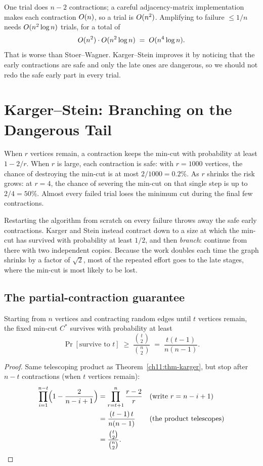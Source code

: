 \begin{complexitybox}
One trial does $n-2$ contractions; a careful adjacency-matrix implementation makes each contraction $O(n)$, so a trial is $O(n^2)$. Amplifying to failure $\le 1/n$ needs $O(n^2\log n)$ trials, for a total of
\[
  O(n^2)\cdot O(n^2\log n) \;=\; O(n^4\log n).
\]
That is worse than Stoer--Wagner. Karger--Stein improves it by noticing that the early contractions are safe and only the late ones are dangerous, so we should not redo the safe early part in every trial.
\end{complexitybox}

\section{Karger--Stein: Branching on the Dangerous Tail}

When $r$ vertices remain, a contraction keeps the min-cut with probability at least $1-2/r$. When $r$ is large, each contraction is safe: with $r=1000$ vertices, the chance of destroying the min-cut is at most $2/1000 = 0.2\%$. As $r$ shrinks the risk grows: at $r=4$, the chance of severing the min-cut on that single step is up to $2/4 = 50\%$. Almost every failed trial loses the minimum cut during the final few contractions.

Restarting the algorithm from scratch on every failure throws away the safe early contractions. Karger and Stein instead contract down to a size at which the min-cut has survived with probability at least $1/2$, and then \emph{branch}: continue from there with two independent copies. Because the work doubles each time the graph shrinks by a factor of $\sqrt{2}$, most of the repeated effort goes to the late stages, where the min-cut is most likely to be lost.

\subsection{The partial-contraction guarantee}

\begin{lemma}\label{ch11:lem-survive}
Starting from $n$ vertices and contracting random edges until $t$ vertices remain, the fixed min-cut $C^\ast$ survives with probability at least
\[
  \Pr[\text{survive to }t] \;\ge\; \frac{\binom{t}{2}}{\binom{n}{2}} \;=\; \frac{t(t-1)}{n(n-1)}.
\]
\end{lemma}

\begin{proof}
Same telescoping product as Theorem~\ref{ch11:thm-karger}, but stop after $n-t$ contractions (when $t$ vertices remain):
\begin{align*}
  \prod_{i=1}^{n-t}\Bigl(1-\frac{2}{n-i+1}\Bigr)
    &= \prod_{r=t+1}^{n}\frac{r-2}{r} && \text{(write $r=n-i+1$)}\\
    &= \frac{(t-1)\,t}{n(n-1)} && \text{(the product telescopes)}\\
    &= \frac{\binom{t}{2}}{\binom{n}{2}}.
\end{align*}
\end{proof}

